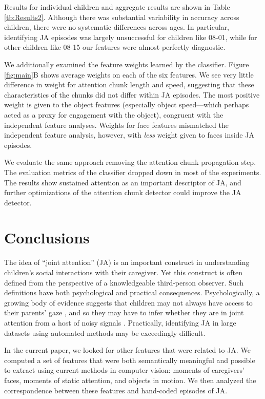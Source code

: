 \documentclass[10pt,letterpaper]{article}
\begin{document}
Results for individual children and aggregate results are shown in Table \ref{tb:Results2}. Although there was substantial variability in accuracy across children, there were no systematic differences across ages. In particular, identifying JA episodes was largely unsuccessful for children like 08-01, while for other children like 08-15 our features were almost perfectly diagnostic. 

We additionally examined the feature weights learned by the classifier. Figure \ref{fig:main}B shows average weights on each of the six features. We see very little difference in weight for attention chunk length and speed, suggesting that these characteristics of the chunks did not differ within JA episodes. The most positive weight is given to the object features (especially object speed---which perhaps acted as a proxy for engagement with the object), congruent with the independent feature analyses. Weights for face features mismatched the independent feature analysis, however, with \emph{less} weight given to faces inside JA episodes. 

We evaluate the same approach removing the attention chunk propagation step. The evaluation metrics of the classifier dropped down in most of the experiments. The results show sustained attention as an important descriptor of JA, and further optimizations of the attention chunk detector could improve the JA detector.%

\section{Conclusions}

The idea of ``joint attention'' (JA) is an important construct in understanding children's social interactions with their caregiver. Yet this construct is often defined from the perspective of a knowledgeable third-person observer. Such definitions have both psychological and practical consequences. Psychologically, a growing body of evidence suggests that children may not always have access to their parents' gaze \cite{franchak2011,yu2013,frank2013}, and so they may have to infer whether they are in joint attention from a host of noisy signals \cite{frank2013b}. Practically, identifying JA in large datasets using automated methods may be exceedingly difficult. 

In the current paper, we looked for other features that were related to JA. We computed a set of features that were both semantically meaningful and possible to extract using current methods in computer vision: moments of caregivers' faces, moments of static attention, and objects in motion. We then analyzed the correspondence between these features and hand-coded episodes of JA. 
\end{document}
